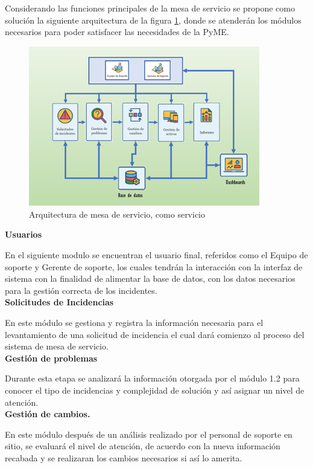 Considerando las funciones principales de la mesa de servicio se propone como solución la siguiente arquitectura de la figura \ref{fig:DMDS}, donde se atenderán los módulos necesarios para poder satisfacer las necesidades de la PyME.

\begin{figure}[htb]
	\centering
	\includegraphics[width=0.9\textwidth]{Capitulo1/Img/MesadeServicioDiagrama}
	\caption{Arquitectura de mesa de servicio, como servicio}
	\label{fig:DMDS}
\end{figure}

\textbf{ Usuarios }

En el siguiente modulo se encuentran el usuario final, referidos como el Equipo de soporte y Gerente de soporte, los cuales tendrán la interacción con la interfaz de sistema con la finalidad de alimentar la base de datos, con los datos necesarios para la gestión correcta de los incidentes.\\

\textbf{Solicitudes de Incidencias }

En este módulo se gestiona y registra la información necesaria para el levantamiento de una solicitud de incidencia el cual dará comienzo al proceso del sistema de mesa de servicio.\\

\textbf{Gestión de problemas }

Durante esta etapa se analizará la información otorgada por el módulo 1.2 para conocer el tipo de incidencias y complejidad de solución y así asignar un nivel de atención.\\

 \textbf{Gestión de cambios.}
 
En este módulo después de un análisis realizado por el personal de soporte en sitio, se evaluará el nivel de atención, de acuerdo con la nueva información recabada y se realizaran los cambios necesarios si así lo amerita.\\

